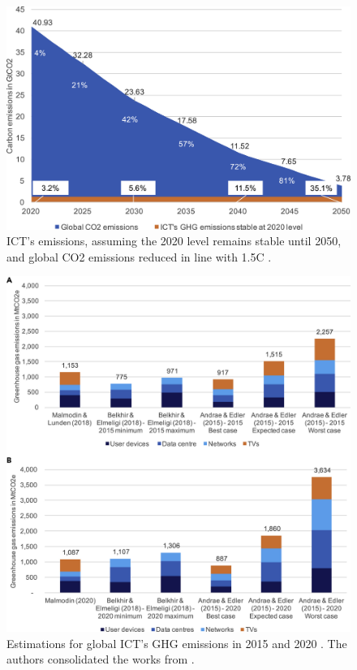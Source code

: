 \begin{figure}[!htb]
    \centering
    \includegraphics[scale=0.8]{Images/Related_works/gr6_lrg.jpg}
    \caption{ICT's emissions, assuming the 2020 level remains stable until 2050, and global CO2 emissions reduced in line with 1.5\degree C \cite{freitag2021climate}.}
    \label{fig:stable_emissions_ICT}
\end{figure}

\begin{figure}[!htb]
    \centering
    \includegraphics[scale=0.8]{Images/Related_works/gr2_lrg.jpg}
    \caption{Estimations for global ICT’s GHG emissions in 2015 and 2020 \cite{freitag2021climate}. The authors consolidated the works from \cite{belkhir2018assessing, andrae2015global, malmodin2018energy, Malmodin2020}.}
    \label{fig:estimations_ICT}
\end{figure}

